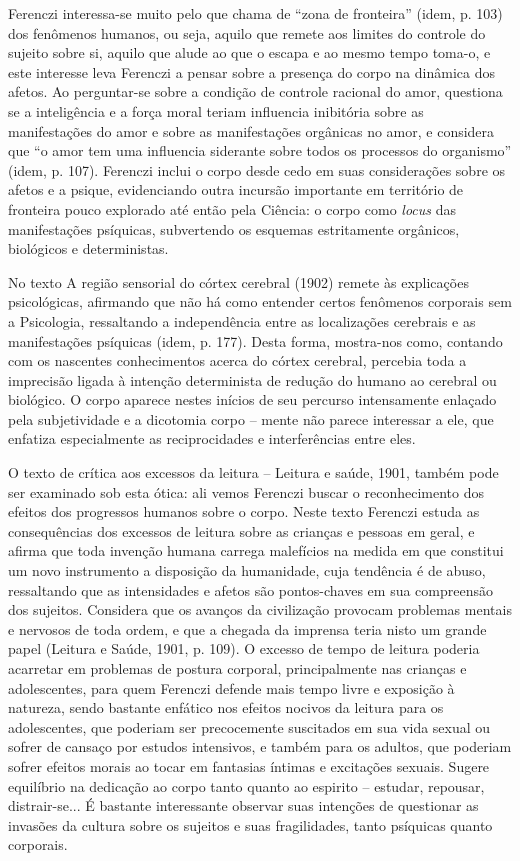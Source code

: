 Ferenczi interessa-se muito pelo que chama de ``zona de fronteira''
(idem, p. 103) dos fenômenos humanos, ou seja, aquilo que remete aos
limites do controle do sujeito sobre si, aquilo que alude ao que o
escapa e ao mesmo tempo toma-o, e este interesse leva Ferenczi a pensar
sobre a presença do corpo na dinâmica dos afetos. Ao perguntar-se sobre
a condição de controle racional do amor, questiona se a inteligência e a
força moral teriam influencia inibitória sobre as manifestações do amor
e sobre as manifestações orgânicas no amor, e considera que ``o amor tem
uma influencia siderante sobre todos os processos do organismo'' (idem,
p. 107). Ferenczi inclui o corpo desde cedo em suas considerações sobre
os afetos e a psique, evidenciando outra incursão importante em
território de fronteira pouco explorado até então pela Ciência: o corpo
como \emph{locus} das manifestações psíquicas, subvertendo os esquemas
estritamente orgânicos, biológicos e deterministas.

No texto A região sensorial do córtex cerebral (1902) remete às
explicações psicológicas, afirmando que não há como entender certos
fenômenos corporais sem a Psicologia, ressaltando a independência entre
as localizações cerebrais e as manifestações psíquicas (idem, p. 177).
Desta forma, mostra-nos como, contando com os nascentes conhecimentos
acerca do córtex cerebral, percebia toda a imprecisão ligada à intenção
determinista de redução do humano ao cerebral ou biológico. O corpo
aparece nestes inícios de seu percurso intensamente enlaçado pela
subjetividade e a dicotomia corpo -- mente não parece interessar a ele,
que enfatiza especialmente as reciprocidades e interferências entre
eles.

O texto de crítica aos excessos da leitura -- Leitura e saúde, 1901,
também pode ser examinado sob esta ótica: ali vemos Ferenczi buscar o
reconhecimento dos efeitos dos progressos humanos sobre o corpo. Neste
texto Ferenczi estuda as consequências dos excessos de leitura sobre as
crianças e pessoas em geral, e afirma que toda invenção humana carrega
malefícios na medida em que constitui um novo instrumento a disposição
da humanidade, cuja tendência é de abuso, ressaltando que as
intensidades e afetos são pontos-chaves em sua compreensão dos sujeitos.
Considera que os avanços da civilização provocam problemas mentais e
nervosos de toda ordem, e que a chegada da imprensa teria nisto um
grande papel (Leitura e Saúde, 1901, p. 109). O excesso de tempo de
leitura poderia acarretar em problemas de postura corporal,
principalmente nas crianças e adolescentes, para quem Ferenczi defende
mais tempo livre e exposição à natureza, sendo bastante enfático nos
efeitos nocivos da leitura para os adolescentes, que poderiam ser
precocemente suscitados em sua vida sexual ou sofrer de cansaço por
estudos intensivos, e também para os adultos, que poderiam sofrer
efeitos morais ao tocar em fantasias íntimas e excitações sexuais.
Sugere equilíbrio na dedicação ao corpo tanto quanto ao espirito --
estudar, repousar, distrair-se... É bastante interessante observar suas
intenções de questionar as invasões da cultura sobre os sujeitos e suas
fragilidades, tanto psíquicas quanto corporais.

